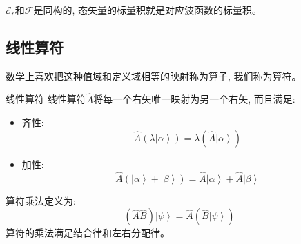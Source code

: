 $\mathscr{E}_r$和$\mathscr{F}$是同构的, 态矢量的标量积就是对应波函数的标量积。

\subsection*{线性算符}
数学上喜欢把这种值域和定义域相等的映射称为算子, 我们称为算符。
\begin{define}{线性算符}
    线性算符$\hat{A}$将每一个右矢唯一映射为另一个右矢, 而且满足:
    \begin{itemize}
        \item 齐性: \[\hat {A}\left( {\lambda \left| \alpha  \right\rangle } \right) = \lambda \left( {\hat{A}\left| \alpha  \right\rangle } \right)\]
        \item 加性: \[\hat {A}\left( {\left| \alpha  \right\rangle  + \left| \beta  \right\rangle } \right) = \hat {A}\left| \alpha  \right\rangle  + \widehat A\left| \beta  \right\rangle \]
    \end{itemize}
\end{define}
算符乘法定义为:\[( {\hat A\hat B} )\left| \psi  \right\rangle  = \hat A\left( {\hat B\left| \psi  \right\rangle } \right)\]
算符的乘法满足结合律和左右分配律。

